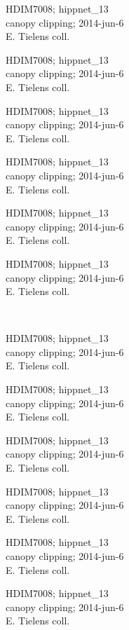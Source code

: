 \documentclass[2pt]{extarticle}
\begin{document}
\noindent
\parbox{0.16\textwidth}{\tiny \raggedright \rule[-0.3\baselineskip]{0pt}{10pt}HDIM7008; hippnet\_13\\ canopy clipping; 2014-jun-6\\ E. Tielens coll.}
\parbox{0.16\textwidth}{\tiny \raggedright \rule[-0.3\baselineskip]{0pt}{10pt}HDIM7008; hippnet\_13\\ canopy clipping; 2014-jun-6\\ E. Tielens coll.}
\parbox{0.16\textwidth}{\tiny \raggedright \rule[-0.3\baselineskip]{0pt}{10pt}HDIM7008; hippnet\_13\\ canopy clipping; 2014-jun-6\\ E. Tielens coll.}
\parbox{0.16\textwidth}{\tiny \raggedright \rule[-0.3\baselineskip]{0pt}{10pt}HDIM7008; hippnet\_13\\ canopy clipping; 2014-jun-6\\ E. Tielens coll.}
\parbox{0.16\textwidth}{\tiny \raggedright \rule[-0.3\baselineskip]{0pt}{10pt}HDIM7008; hippnet\_13\\ canopy clipping; 2014-jun-6\\ E. Tielens coll.}
\parbox{0.16\textwidth}{\tiny \raggedright \rule[-0.3\baselineskip]{0pt}{10pt}HDIM7008; hippnet\_13\\ canopy clipping; 2014-jun-6\\ E. Tielens coll.} \\ 
\vspace{0.001in} 

\noindent
\parbox{0.16\textwidth}{\tiny \raggedright \rule[-0.3\baselineskip]{0pt}{10pt}HDIM7008; hippnet\_13\\ canopy clipping; 2014-jun-6\\ E. Tielens coll.}
\parbox{0.16\textwidth}{\tiny \raggedright \rule[-0.3\baselineskip]{0pt}{10pt}HDIM7008; hippnet\_13\\ canopy clipping; 2014-jun-6\\ E. Tielens coll.}
\parbox{0.16\textwidth}{\tiny \raggedright \rule[-0.3\baselineskip]{0pt}{10pt}HDIM7008; hippnet\_13\\ canopy clipping; 2014-jun-6\\ E. Tielens coll.}
\parbox{0.16\textwidth}{\tiny \raggedright \rule[-0.3\baselineskip]{0pt}{10pt}HDIM7008; hippnet\_13\\ canopy clipping; 2014-jun-6\\ E. Tielens coll.}
\parbox{0.16\textwidth}{\tiny \raggedright \rule[-0.3\baselineskip]{0pt}{10pt}HDIM7008; hippnet\_13\\ canopy clipping; 2014-jun-6\\ E. Tielens coll.}
\parbox{0.16\textwidth}{\tiny \raggedright \rule[-0.3\baselineskip]{0pt}{10pt}HDIM7008; hippnet\_13\\ canopy clipping; 2014-jun-6\\ E. Tielens coll.} \\ 
\vspace{0.001in} 
\end{document}
